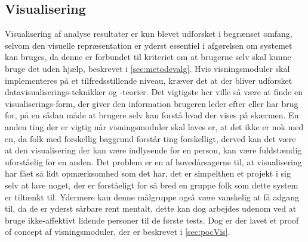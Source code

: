 \subsection{Visualisering}\label{sec:soevnVisVidArb}
Visualisering af analyse resultater er kun blevet udforsket i begrænset omfang, selvom den visuelle repræsentation er yderst essentiel i afgørelsen om systemet kan bruges, da denne er forbundet til kriteriet om at brugerne selv skal kunne bruge det uden hjælp, beskrevet i \cref{sec:metodevalg}.
Hvis visningsmoduler skal implementeres på et tilfredsstillende niveau, kræver det at der bliver udforsket datavisualiserings-teknikker og -teorier.
Det vigtigste her ville så være at finde en visualiserings-form, der giver den information brugeren leder efter eller har brug for, på en sådan måde at brugere selv kan forstå hvad der vises på skærmen.
En anden ting der er vigtig når visningsmoduler skal laves er, at det ikke er nok med en, da folk med forskellig baggrund forstår ting forskelligt, derved kan det være at den visualisering der kan være indlysende for en person, kan være fuldstændig uforståelig for en anden.
Det problem er en af hovedårsagerne til, at visualisering har fået så lidt opmærksomhed som det har, det er simpelthen et projekt i sig selv at lave noget, der er forståeligt for så bred en gruppe folk som dette system er tiltænkt til.
Ydermere kan denne målgruppe også være vanskelig at få adgang til, da de er yderst sårbare rent mentalt, dette kan dog arbejdes udenom ved at bruge ikke-affektivt lidende personer til de første tests.
Dog er der lavet et proof of concept af visningsmoduler, der er beskrevet i \cref{sec:pocVis}.